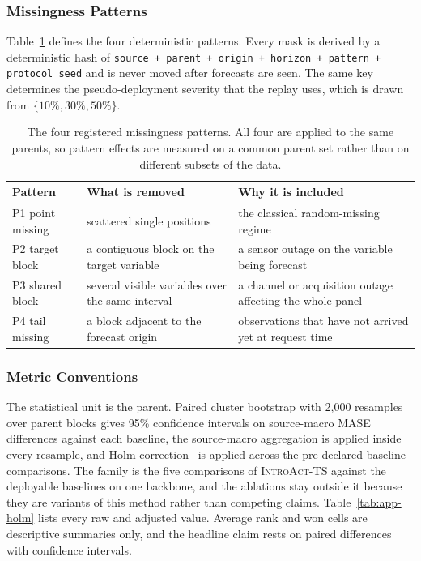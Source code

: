 \documentclass{article}
\newcommand{\introact}{\textsc{IntroAct-TS}}
\begin{document}
\subsubsection{Missingness Patterns}
\label{app:patterns}
Table~\ref{tab:app-patterns} defines the four deterministic patterns. Every mask is derived
by a deterministic hash of
\texttt{source + parent + origin + horizon + pattern + protocol\_seed} and is never moved
after forecasts are seen. The same key determines the pseudo-deployment severity that the
replay uses, which is drawn from $\{10\%, 30\%, 50\%\}$.

\begin{table}[htbp]
  \caption{The four registered missingness patterns. All four are applied to the same parents,
  so pattern effects are measured on a common parent set rather than on different subsets of
  the data.}
  \label{tab:app-patterns}
  \centering
  \small
  \setlength{\tabcolsep}{4pt}
\begin{tabular}{@{}l p{} p{}@{}}
    \toprule
    Pattern & What is removed & Why it is included \\
    \midrule
    P1 point missing    & scattered single positions & the classical random-missing regime \\
    P2 target block     & a contiguous block on the target variable & a sensor outage on the variable being forecast \\
    P3 shared block     & several visible variables over the same interval & a channel or acquisition outage affecting the whole panel \\
    P4 tail missing     & a block adjacent to the forecast origin & observations that have not arrived yet at request time \\
    \bottomrule
  \end{tabular}
\end{table}

\subsubsection{Metric Conventions}
\label{app:metric-conventions}
The statistical unit is the parent. Paired cluster bootstrap with 2,000 resamples
over parent blocks gives 95\% confidence intervals on source-macro MASE differences against
each baseline, the source-macro aggregation is applied inside every resample, and Holm
correction~\citep{holm1979simple} is applied across the pre-declared baseline comparisons.
The family is the five comparisons of \introact{} against the deployable baselines on one
backbone, and the ablations stay outside it because they are variants of this method rather
than competing claims. Table~\ref{tab:app-holm} lists every raw and adjusted value.
Average rank and won cells are descriptive summaries only, and the headline claim rests on
paired differences with confidence intervals.
\end{document}
